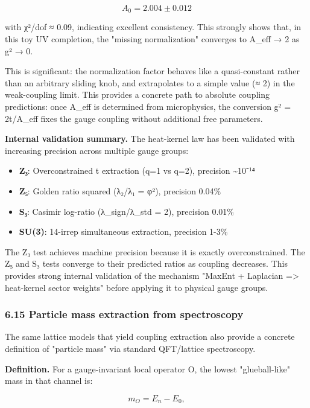 \[
A_0 = 2.004 \pm 0.012
\]

with χ²/dof ≈ 0.09, indicating excellent consistency. This strongly shows that, in this toy UV completion, the "missing normalization" converges to A\_eff → 2 as g² → 0.

This is significant: the normalization factor behaves like a quasi-constant rather than an arbitrary sliding knob, and extrapolates to a simple value (≈ 2) in the weak-coupling limit. This provides a concrete path to absolute coupling predictions: once A\_eff is determined from microphysics, the conversion g² = 2t/A\_eff fixes the gauge coupling without additional free parameters.

\textbf{Internal validation summary.} The heat-kernel law has been validated with increasing precision across multiple gauge groups:

\begin{itemize}
\tightlist
\item
  \textbf{Z₃}: Overconstrained t extraction (q=1 vs q=2), precision \textasciitilde10⁻¹⁴
\item
  \textbf{Z₅}: Golden ratio squared (λ₂/λ₁ = φ²), precision 0.04\%
\item
  \textbf{S₃}: Casimir log-ratio (λ\_sign/λ\_std = 2), precision 0.01\%
\item
  \textbf{SU(3)}: 14-irrep simultaneous extraction, precision 1-3\%
\end{itemize}

The Z₃ test achieves machine precision because it is exactly overconstrained. The Z₅ and S₃ tests converge to their predicted ratios as coupling decreases. This provides strong internal validation of the mechanism "MaxEnt + Laplacian =\textgreater{} heat-kernel sector weights" before applying it to physical gauge groups.

\subsubsection{6.15 Particle mass extraction from spectroscopy}\label{615-particle-mass-extraction-from-spectroscopy}

The same lattice models that yield coupling extraction also provide a concrete definition of "particle mass" via standard QFT/lattice spectroscopy.

\textbf{Definition.} For a gauge-invariant local operator O, the lowest "glueball-like" mass in that channel is:

\[
m_O = E_n - E_0,
\]

